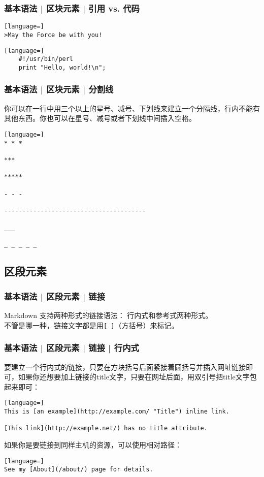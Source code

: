 \begin{frame}[fragile]
  \frametitle{基本语法 | 区块元素 | 引用 vs. 代码}
\begin{lstlisting}[language=]
>May the Force be with you!
\end{lstlisting}
  \pause
\begin{lstlisting}[language=]
    #!/usr/bin/perl
    print "Hello, world!\n";
\end{lstlisting}
\end{frame}

\begin{frame}[fragile]
  \frametitle{基本语法 | 区块元素 | \alert{分割线}}
    你可以在一行中用三个以上的星号、减号、下划线来建立一个分隔线，行内不能有其他东西。你也可以在星号、减号或者下划线中间插入空格。
\begin{lstlisting}[language=]
* * *

***

*****

- - -

---------------------------------------

___

_ _ _ _ _
\end{lstlisting}
\end{frame}

\subsection{区段元素}
\begin{frame}[fragile]
  \frametitle{基本语法 | 区段元素 | 链接}
  Markdown 支持两种形式的链接语法： 行内式和参考式两种形式。\\
  \vspace{1em}
  不管是哪一种，链接文字都是用\verb|[ ]|（方括号）来标记。
\end{frame}

\begin{frame}[fragile]
  \frametitle{基本语法 | 区段元素 | 链接 | \alert{行内式}}
  要建立一个行内式的链接，只要在方块括号后面紧接着圆括号并插入网址链接即可，如果你还想要加上链接的title文字，只要在网址后面，用双引号把title文字包起来即可：
\begin{lstlisting}[language=]
This is [an example](http://example.com/ "Title") inline link.

[This link](http://example.net/) has no title attribute.
\end{lstlisting}
\pause
如果你是要链接到同样主机的资源，可以使用相对路径：
\begin{lstlisting}[language=]
See my [About](/about/) page for details.
\end{lstlisting}
\end{frame}


